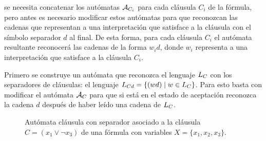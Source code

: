 se necesita concatenar los autómatas $\mathcal{A}_{C_i}$ para cada cláusula $C_i$ de la fórmula, pero antes es necesario modificar estos autómatas para que reconozcan las cadenas que representan a una interpretación que satisface a la cláusula con el símbolo separador $d$ al final. De esta forma, para cada cláusula $C_i$ el autómata resultante reconocerá las cadenas de la forma $w_id$, donde $w_i$ representa a una interpretación que satisface a la cláusula $C_i$.

Primero se construye un autómata que reconozca el lenguaje $L_{C}$ con los separadores de cláusulas: el lenguaje $L_{Cd} = \{(wd) \;|\; w \in L_{C}\}$. Para esto basta con modificar el autómata $\mathcal{A}_{C}$ para que si está en el estado de aceptación reconozca la cadena $d$ después de haber leído una cadena de $L_{C}$.


\begin{figure}[t]
    \begin{otherlanguage}{english}
        \centering
    \end{otherlanguage}

    \caption{Autómata cláusula con separador asociado a la cláusula $C = (x_1 \lor \neg x_3)$ de una fórmula con variables $X = \{x_1, x_2, x_3\}$.}
    \label{fig:clause_automaton_d}
\end{figure}

